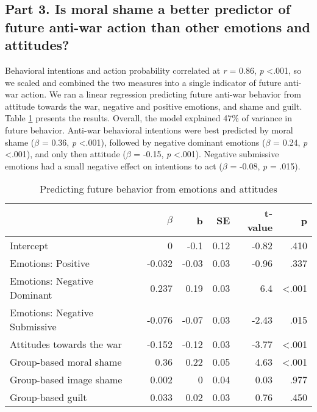 \documentclass[
]{article}
\begin{document}
\hypertarget{part-3.-is-moral-shame-a-better-predictor-of-future-anti-war-action-than-other-emotions-and-attitudes}{%
\subsection*{Part 3. Is moral shame a better predictor of future anti-war action than other emotions and attitudes?}\label{part-3.-is-moral-shame-a-better-predictor-of-future-anti-war-action-than-other-emotions-and-attitudes}}

Behavioral intentions and action probability correlated at \emph{r} = 0.86, \emph{p} \textless.001, so we scaled and combined the two measures into a single indicator of future anti-war action. We ran a linear regression predicting future anti-war behavior from attitude towards the war, negative and positive emotions, and shame and guilt. Table \ref{tab:Table3} presents the results. Overall, the model explained 47\% of variance in future behavior. Anti-war behavioral intentions were best predicted by moral shame (\(\beta\) = 0.36, \emph{p} \textless.001), followed by negative dominant emotions (\(\beta\) = 0.24, \emph{p} \textless.001), and only then attitude (\(\beta\) = -0.15, \emph{p} \textless.001). Negative submissive emotions had a small negative effect on intentions to act (\(\beta\) = -0.08, \emph{p} = .015).

\begin{table}[H]

\caption{\label{tab:Table3}Predicting future behavior from emotions and attitudes
}
\centering
\fontsize{8}{10}\selectfont
\begin{tabular}[t]{lrrrrr}
\toprule
  & $\beta$ & b & SE & t-value & p\\
\midrule
Intercept & 0 & -0.1 & 0.12 & -0.82 & .410\\
Emotions: Positive & -0.032 & -0.03 & 0.03 & -0.96 & .337\\
Emotions: Negative Dominant & 0.237 & 0.19 & 0.03 & 6.4 & <.001\\
Emotions: Negative Submissive & -0.076 & -0.07 & 0.03 & -2.43 & .015\\
Attitudes towards the war & -0.152 & -0.12 & 0.03 & -3.77 & <.001\\
\addlinespace
Group-based moral shame & 0.36 & 0.22 & 0.05 & 4.63 & <.001\\
Group-based image shame & 0.002 & 0 & 0.04 & 0.03 & .977\\
Group-based guilt & 0.033 & 0.02 & 0.03 & 0.76 & .450\\
\bottomrule
\end{tabular}
\end{table}
\end{document}

